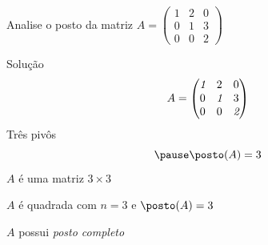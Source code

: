 \begin{question}
  Analise o posto da matriz
  \quad
  \(
    A =
    \begin{pmatrix}
      1 & 2 & 0 \\
      0 & 1 & 3 \\
      0 & 0 & 2
    \end{pmatrix}
  \)
\end{question}

\begin{resolution}{Solução}
  \[
    A=
    \begin{pmatrix}
      \emph{1} & 2        & 0        \\
      0        & \emph{1} & 3        \\
      0        & 0        & \emph{2}
    \end{pmatrix}
  \]
  \pause
  Três pivôs
  \[
    \pause
    \posto(A) = 3
  \]
  \pause
  $A$ é uma matriz $3 \times 3$

  \pause
  $A$ é quadrada com $n=3$
  \pause
  e \(\posto(A) = 3\)

  \pause
  $A$ possui \emph{posto completo}
\end{resolution}

\endinput
